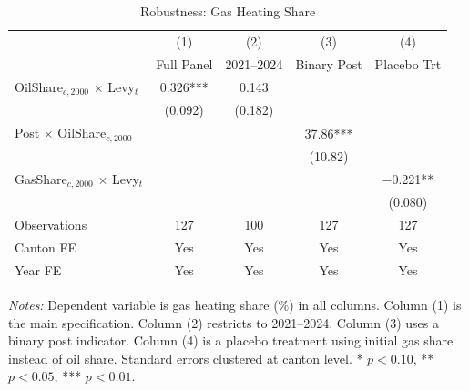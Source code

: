 \begin{table}[H]
\centering
\caption{Robustness: Gas Heating Share}
\label{tab:robustness}
\begin{threeparttable}
\begin{tabular}{lcccc}
\toprule
& (1) & (2) & (3) & (4) \\
& Full Panel & 2021--2024 & Binary Post & Placebo Trt \\
\midrule
OilShare$_{c,2000}$ $\times$ Levy$_t$ & 0.326*** & 0.143 & & \\
& (0.092) & (0.182) & & \\
[0.3em]
Post $\times$ OilShare$_{c,2000}$ & & & 37.86*** & \\
& & & (10.82) & \\
[0.3em]
GasShare$_{c,2000}$ $\times$ Levy$_t$ & & & & $-$0.221** \\
& & & & (0.080) \\
[0.5em]
Observations & 127 & 100 & 127 & 127 \\
Canton FE & Yes & Yes & Yes & Yes \\
Year FE & Yes & Yes & Yes & Yes \\
\bottomrule
\end{tabular}
\begin{tablenotes}[flushleft]
\small
\item \textit{Notes:} Dependent variable is gas heating share (\%) in all columns. Column (1) is the main specification. Column (2) restricts to 2021--2024. Column (3) uses a binary post indicator. Column (4) is a placebo treatment using initial gas share instead of oil share. Standard errors clustered at canton level. * $p<0.10$, ** $p<0.05$, *** $p<0.01$.
\end{tablenotes}
\end{threeparttable}
\end{table}
